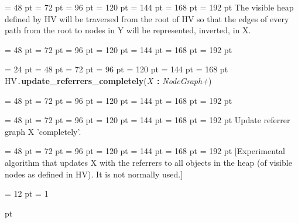 {{{{\par \noindent  \leftskip = 48 pt  \leftmargini = 72 pt  \leftmarginii = 96 pt  \leftmarginiii = 120 pt  \leftmarginiv = 144 pt  \leftmarginv = 168 pt  \leftmarginvi = 192 pt  The visible heap defined by HV will be traversed from the root of HV
so that the edges of every path from the root to nodes in Y will be
represented, inverted, in X.\par}
{\par \noindent  \leftskip = 48 pt  \leftmargini = 72 pt  \leftmarginii = 96 pt  \leftmarginiii = 120 pt  \leftmarginiv = 144 pt  \leftmarginv = 168 pt  \leftmarginvi = 192 pt {\par \noindent
\par}
\par}
\par}
\par}
{\par \noindent  \leftskip = 24 pt  \leftmargini = 48 pt  \leftmarginii = 72 pt  \leftmarginiii = 96 pt  \leftmarginiv = 120 pt  \leftmarginv = 144 pt  \leftmarginvi = 168 pt HV{\tt .\/}{\bf {\large {\bf update{\_}referrers{\_}completely\/}}\/}({\em X\/}~{\bf :}  {\em NodeGraph+\/}){\par \noindent
{\par \noindent  \leftskip = 48 pt  \leftmargini = 72 pt  \leftmarginii = 96 pt  \leftmarginiii = 120 pt  \leftmarginiv = 144 pt  \leftmarginv = 168 pt  \leftmarginvi = 192 pt {\par \noindent
\par}
\par}
{\par \noindent  \leftskip = 48 pt  \leftmargini = 72 pt  \leftmarginii = 96 pt  \leftmarginiii = 120 pt  \leftmarginiv = 144 pt  \leftmarginv = 168 pt  \leftmarginvi = 192 pt  Update referrer graph X 'completely'.\par}
{\par \noindent  \leftskip = 48 pt  \leftmargini = 72 pt  \leftmarginii = 96 pt  \leftmarginiii = 120 pt  \leftmarginiv = 144 pt  \leftmarginv = 168 pt  \leftmarginvi = 192 pt  {[}Experimental algorithm that updates X with the referrers to all
objects in the heap (of visible nodes as defined in HV). It is not
normally used.]
\par}
\par}
\par}
{\par \pagebreak[3.300000] \noindent \hangindent = 12 pt \hangafter = 1 
{\par \pagebreak[3]  pt \noindent
}}}

